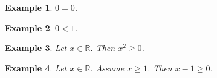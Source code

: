 \documentclass{article}
\newtheorem{example}{Example}
\begin{document}
\begin{example}
$0=0$.
\end{example}

\begin{example}
$0<1$.
\end{example}

\begin{example}
Let $x\in\mathbb{R}$. Then $x^2\geq 0$.
\end{example}

\begin{example}
Let $x\in\mathbb{R}$. Assume $x\geq 1$. Then $x-1\geq 0$.
\end{example}
\end{document}
